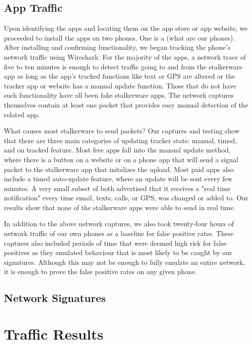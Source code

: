 \documentclass[acmtog]{acmart}
\begin{document}
\subsection{App Traffic}

Upon identifying the apps and locating them on the app store or app website, we 
proceeded to install the apps on two phones. One is a (what are our phones). 
After installing and confirming functionality, we began tracking the phone's 
network traffic using Wireshark. For the majority of the apps, a network trace 
of five to ten minutes is enough to detect traffic going to and from the 
stalkerware app as long as the app's tracked functions like text or GPS are 
altered or the tracker app or website has a manual update function. Those that 
do not have such functionality have all been fake stalkerware apps. The network 
captures themselves contain at least one packet that provides easy manual 
detection of the related app.

What causes most stalkerware to send packets? Our captures and testing show that there are three main categories of updating tracker state: manual, timed, and on tracked feature. Most free apps fall into the manual update method, where there is a button on a website or on a phone app that will send a signal packet to the stalkerware app that initalizes the upload. Most paid apps also include a timed auto-update feature, where an update will be sent every few minutes. A very small subset of both advertised that it receives a "real time notification" every time email, texts, calls, or GPS, was changed or added to. Our results show that none of the stalkerware apps were able to send in real time.

In addition to the above network captures, we also took twenty-four hours of 
network traffic of our own phones as a baseline for false positive rates. These 
captures also included periods of time that were deemed high risk for false 
positives as they emulated behaviour that is most likely to be caught by our 
signatures. Although this may not be enough to fully emulate an entire network, 
it is enough to prove the false positive rates on any given phone.

\subsection{Network Signatures}


\section{Traffic Results}
\end{document}
